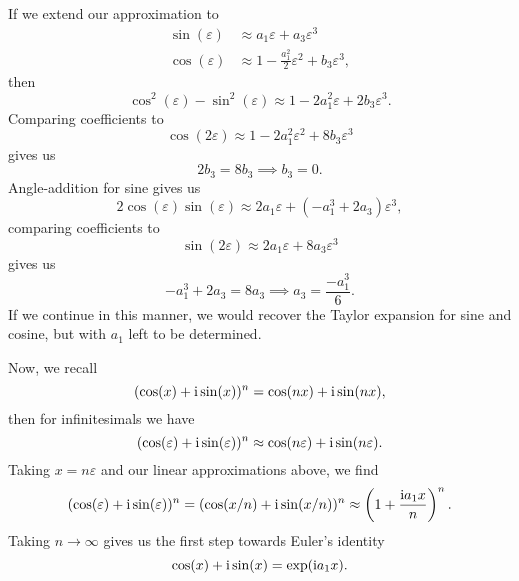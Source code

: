 If we extend our approximation to
\begin{subequations}
\begin{align}
\sin(\varepsilon) &\approx a_{1}\varepsilon + a_{3}\varepsilon^{3}\\
\cos(\varepsilon) &\approx 1 - \frac{a_{1}^{2}}{2}\varepsilon^{2} + b_{3}\varepsilon^{3},
\end{align}
\end{subequations}
then
\begin{equation}
\cos^{2}(\varepsilon) - \sin^{2}(\varepsilon)\approx 1 - 2a_{1}^{2}\varepsilon
+ 2b_{3}\varepsilon^{3}.
\end{equation}
Comparing coefficients to
\begin{equation}
\cos(2\varepsilon)\approx 1 - 2a_{1}^{2}\varepsilon^{2} + 8b_{3}\varepsilon^{3}
\end{equation}
gives us
\begin{equation}
2b_{3} = 8b_{3}\implies b_{3}=0.
\end{equation}
Angle-addition for sine gives us
\begin{equation}
2\cos(\varepsilon)\sin(\varepsilon)\approx 2a_{1}\varepsilon +
(-a_{1}^{3} + 2a_{3})\varepsilon^{3},
\end{equation}
comparing coefficients to
\begin{equation}
\sin(2\varepsilon)\approx 2a_{1}\varepsilon + 8a_{3}\varepsilon^{3}
\end{equation}
gives us
\begin{equation}
-a_{1}^{3} + 2a_{3} = 8a_{3}\implies a_{3} = \frac{-a_{1}^{3}}{6}.
\end{equation}
If we continue in this manner, we would recover the Taylor expansion for
sine and cosine, but with $a_{1}$ left to be determined.

Now, we recall
\begin{equation}
(\cos(x) + \mathrm{i}\sin(x))^{n} = \cos(nx) + \mathrm{i}\sin(nx),
\end{equation}
then for infinitesimals we have
\begin{equation}
(\cos(\varepsilon) + \mathrm{i}\sin(\varepsilon))^{n}\approx\cos(n\varepsilon)
+\mathrm{i}\sin(n\varepsilon).
\end{equation}
Taking $x=n\varepsilon$ and our linear approximations above, we find
\begin{equation}
(\cos(\varepsilon) + \mathrm{i}\sin(\varepsilon))^{n} = (\cos(x/n) + \mathrm{i}\sin(x/n))^{n}
\approx \left(1 + \frac{\mathrm{i} a_{1} x}{n}\right)^{n}.
\end{equation}
Taking $n\to\infty$ gives us the first step towards Euler's identity
\begin{equation}
\cos(x) + \mathrm{i}\sin(x) = \exp(\mathrm{i} a_{1}x).
\end{equation}

